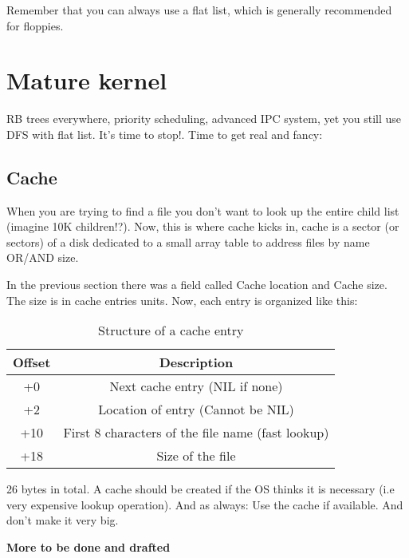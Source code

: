 \documentclass[12pt]{article}
\begin{document}
Remember that you can always use a flat list, which is generally recommended for floppies.

\section{Mature kernel}

RB trees everywhere, priority scheduling, advanced IPC system, yet you still use DFS with flat list. It's time to stop!. Time to get real and fancy:

\subsection{Cache}
When you are trying to find a file you don't want to look up the entire child list (imagine 10K children!?). Now, this is where cache kicks in, cache is a sector (or sectors) of a disk dedicated to a small array table to address files by name OR/AND size.

In the previous section there was a field called Cache location and Cache size. The size is in cache entries units. Now, each entry is organized like this:

\begin{table}
\centering
\begin{tabular}{ |c|c| }
\hline
Offset & Description \\
\hline
+0 & Next cache entry (NIL if none) \\
+2 & Location of entry (Cannot be NIL) \\
+10 & First 8 characters of the file name (fast lookup) \\
+18 & Size of the file \\
\hline
\end{tabular}
\caption{Structure of a cache entry}
\end{table}

26 bytes in total. A cache should be created if the OS thinks it is necessary (i.e very expensive lookup operation). And as always: Use the cache if available. And don't make it very big.

\textbf{More to be done and drafted}
\end{document}

